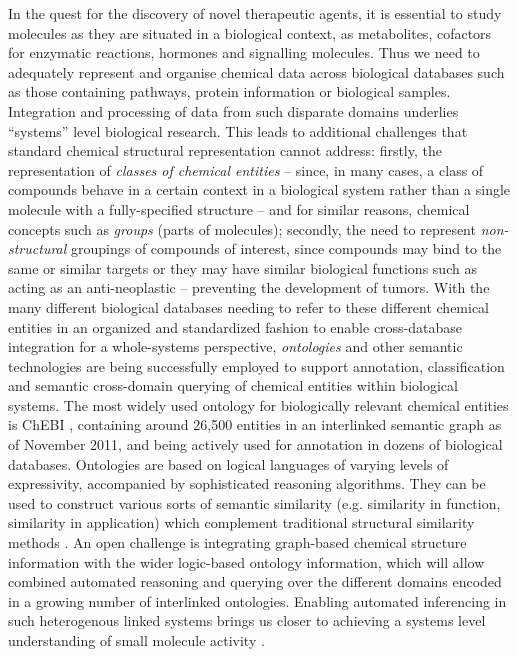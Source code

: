 \documentclass{sig-alternate}
\begin{document}
In the quest for the discovery of novel therapeutic agents, it is
essential to study molecules as they are situated in a biological
context, as metabolites, cofactors for enzymatic reactions, hormones
and signalling molecules. Thus we need to adequately represent and
organise chemical data across biological databases such as those
containing pathways, protein information or biological
samples. Integration and processing of data from such disparate
domains underlies ``systems'' level biological research.  This leads
to additional challenges that standard chemical structural
representation cannot address: firstly, the representation of
\textit{classes of chemical entities} -- since, in many cases, a class
of compounds behave in a certain context in a biological system rather
than a single molecule with a fully-specified structure -- and for
similar reasons, chemical concepts such as \textit{groups} (parts of
molecules); secondly, the need to represent \textit{non-structural}
groupings of compounds of interest, since compounds may bind to the
same or similar targets or they may have similar biological functions
such as acting as an anti-neoplastic -- preventing the development of
tumors. With the many different biological databases needing to refer
to these different chemical entities in an organized and standardized
fashion to enable cross-database integration for a whole-systems
perspective, \textit{ontologies} and other semantic technologies are
being successfully employed to support annotation, classification and
semantic cross-domain querying of chemical entities within biological
systems. The most widely used ontology for biologically relevant
chemical entities is ChEBI \cite{chebi2010}, containing around 26,500
entities in an interlinked semantic graph as of November 2011, and
being actively used for annotation in dozens of biological databases.
Ontologies are based on logical languages of varying levels of
expressivity, accompanied by sophisticated reasoning algorithms. They
can be used to construct various sorts of semantic similarity
(e.g. similarity in function, similarity in application) which
complement traditional structural similarity methods \cite{couto2010}.
An open challenge is integrating graph-based chemical structure
information with the wider logic-based ontology information, which
will allow combined automated reasoning and querying over the
different domains encoded in a growing number of interlinked
ontologies. %
Enabling automated inferencing in such heterogenous linked systems
brings us closer to achieving a systems level understanding of small
molecule activity \cite{Oprea:2007fk}.
\end{document}

